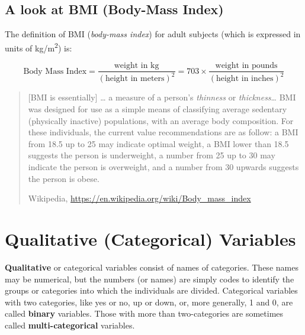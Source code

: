 \documentclass[
]{book}
\begin{document}
\hypertarget{a-look-at-bmi-body-mass-index}{%
\subsection{A look at BMI (Body-Mass Index)}\label{a-look-at-bmi-body-mass-index}}

The definition of BMI (\emph{body-mass index}) for adult subjects (which is expressed in units of kg/m\textsuperscript{2}) is:

\[
\mbox{Body Mass Index} = \frac{\mbox{weight in kg}}{(\mbox{height in meters})^2} = 703 \times \frac{\mbox{weight in pounds}}{(\mbox{height in inches})^2}
\]

\begin{quote}
{[}BMI is essentially{]} \ldots{} a measure of a person's \emph{thinness} or \emph{thickness}\ldots{} BMI was designed for use as a simple means of classifying average sedentary (physically inactive) populations, with an average body composition. For these individuals, the current value recommendations are as follow: a BMI from 18.5 up to 25 may indicate optimal weight, a BMI lower than 18.5 suggests the person is underweight, a number from 25 up to 30 may indicate the person is overweight, and a number from 30 upwards suggests the person is obese.

Wikipedia, \url{https://en.wikipedia.org/wiki/Body_mass_index}
\end{quote}

\hypertarget{qualitative-categorical-variables}{%
\section{Qualitative (Categorical) Variables}\label{qualitative-categorical-variables}}

\textbf{Qualitative} or categorical variables consist of names of categories. These names may be numerical, but the numbers (or names) are simply codes to identify the groups or categories into which the individuals are divided. Categorical variables with two categories, like yes or no, up or down, or, more generally, 1 and 0, are called \textbf{binary} variables. Those with more than two-categories are sometimes called \textbf{multi-categorical} variables.
\end{document}
